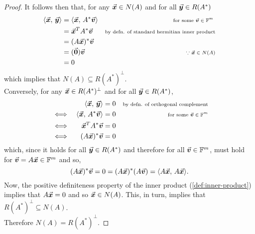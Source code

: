 \documentclass[../MathsNotesBase.tex]{subfiles}
\begin{document}
{\begin{proof}
			It follows then that, for any ${ \vec{\bm{x}} \in N(A) }$ and for all ${ \vec{\bm{y}} \in R(A^*)}$
			\[\begin{aligned}
				\langle \vec{\bm{x}},\, \vec{\bm{y}} \rangle &= \langle \vec{\bm{x}},\, A^*\vec{\bm{v}} \rangle &\text{\scriptsize{for some ${ \vec{\bm{v}} \in \mathbb{F}^{m} }$ }}\\
				&= \vec{\bm{x}}^T A^*\vec{\bm{v}} &\text{\scriptsize{by defn. of standard hermitian inner product}} \\
				&= (A\vec{\bm{x}})^* \vec{\bm{v}} &\text{\scriptsize{}} \\
				&= (\vec{\bm{0}}) \vec{\bm{v}} &\text{\scriptsize{${ \because \vec{\bm{x}} \in N(A) }$}} \\
				&= 0
			\end{aligned}\]
			which implies that ${ N(A) \subseteq R(A^*)^\perp }$.\\
			
			Conversely, for any ${ \vec{\bm{x}} \in R(A^*)^\perp }$ and for all ${ \vec{\bm{y}} \in R(A^*) }$,
			\[\begin{aligned}
				&& \langle \vec{\bm{x}},\, \vec{\bm{y}} \rangle &= 0 &\text{\scriptsize{by defn. of orthogonal complement}}\\
				&\iff & \langle \vec{\bm{x}},\, A^* \vec{\bm{v}} \rangle &= 0 &\text{\scriptsize{for some ${ \vec{\bm{v}} \in \mathbb{F}^{m} }$}} \\
				&\iff & \vec{\bm{x}}^T A^* \vec{\bm{v}} &= 0 \\
				&\iff & (A \vec{\bm{x}})^* \vec{\bm{v}} &= 0
			\end{aligned}\]
			which, since it holds for all ${ \vec{\bm{y}} \in R(A^*) }$ and therefore for all ${ \vec{\bm{v}} \in \mathbb{F}^{m} }$, must hold for ${ \vec{\bm{v}} = A \vec{\bm{x}} \in \mathbb{F}^{m} }$ and so,
			\[ (A \vec{\bm{x}})^* \vec{\bm{v}} = 0 = (A \vec{\bm{x}})^* (A \vec{\bm{v}}) = \langle A\vec{\bm{x}},\, A\vec{\bm{x}} \rangle. \]
			Now, the positive definiteness property of the inner product (\ref{def:inner-product}) implies that ${ A\vec{\bm{x}} = 0 }$ and so ${ \vec{\bm{x}} \in N(A) }$. This, in turn, implies that ${ R(A^*)^\perp \subseteq N(A) }$.\\
			
			Therefore ${ N(A) = R(A^*)^\perp }$.
		\end{proof}

	
	
}
\end{document}
